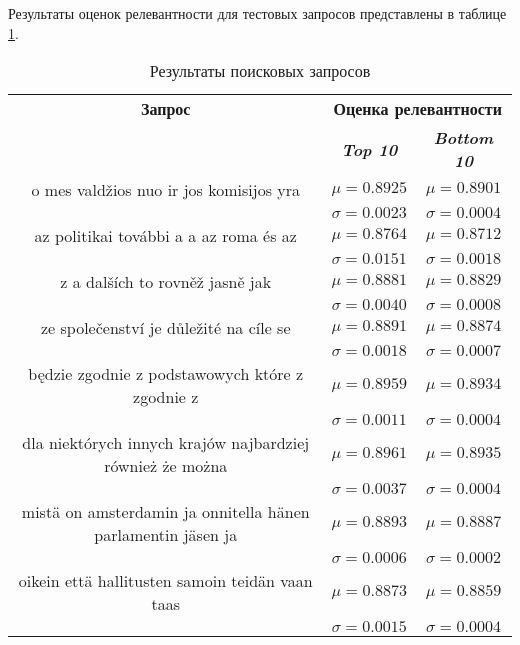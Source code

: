 Результаты оценок релевантности для тестовых запросов представлены в таблице \ref{tab8}.

\begin{table}[tbp]
    \caption{Результаты поисковых запросов}
    \begin{center}
    \begin{tabular}{ccc}
    \toprule
    \textbf{Запрос}&\multicolumn{2}{c}{\textbf{Оценка релевантности}} \\
    & \textbf{\textit{Top 10}}& \textbf{\textit{Bottom 10}} \\
    \midrule
    o mes   valdžios nuo ir  jos komisijos yra& \(\mu=0.8925\) & \(\mu=0.8901\) \\
    & \(\sigma=0.0023\) & \(\sigma=0.0004\) \\
    \midrule
    az politikai további a  a az roma és az& \(\mu=0.8764\) & \(\mu=0.8712\) \\
    & \(\sigma=0.0151\) & \(\sigma=0.0018\) \\
    \midrule
    z a dalších  to rovněž jasně   jak& \(\mu=0.8881\) & \(\mu=0.8829\) \\
    & \(\sigma=0.0040\) & \(\sigma=0.0008\) \\
    \midrule
    ze společenství  je důležité na cíle  se& \(\mu=0.8891\) & \(\mu=0.8874\) \\
    & \(\sigma=0.0018\) & \(\sigma=0.0007\) \\
    \midrule
    będzie zgodnie z podstawowych  które z zgodnie z & \(\mu=0.8959\) & \(\mu=0.8934\) \\
    & \(\sigma=0.0011\) & \(\sigma=0.0004\) \\
    \midrule
    dla niektórych innych krajów najbardziej  również  że można & \(\mu=0.8961\) & \(\mu=0.8935\) \\
    & \(\sigma=0.0037\) & \(\sigma=0.0004\) \\
    \midrule
    mistä on amsterdamin ja onnitella hänen parlamentin jäsen ja & \(\mu=0.8893\) & \(\mu=0.8887\) \\
    & \(\sigma=0.0006\) & \(\sigma=0.0002\) \\
    \midrule
    oikein  että hallitusten samoin   teidän  vaan taas & \(\mu=0.8873\) & \(\mu=0.8859\) \\
    & \(\sigma=0.0015\) & \(\sigma=0.0004\) \\
    \bottomrule
    \end{tabular}\label{tab8}
    \end{center}
\end{table}